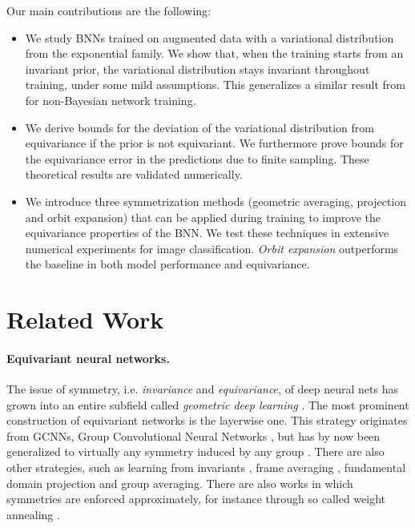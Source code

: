 \documentclass{article}
\begin{document}
Our main contributions are the following:
\begin{itemize}
    \item We study BNNs trained on augmented data with a variational distribution from the exponential family. We show that, when the training starts from an invariant prior, the variational distribution stays invariant throughout training, under some mild assumptions. This generalizes a similar result from \citet{nordenfors2025optimization} for non-Bayesian network training.
    \item We derive bounds for the deviation of the variational distribution from equivariance if the prior is not equivariant. We furthermore prove bounds for the equivariance error in the predictions due to finite sampling. These theoretical results are validated numerically.
    \item We introduce three symmetrization methods (geometric averaging, projection and orbit expansion) that can be applied during training to improve the equivariance properties of the BNN. We test these techniques in extensive numerical experiments for image classification. \emph{Orbit expansion} outperforms the baseline in both model performance and equivariance.
    
\end{itemize}





\section{Related Work}

\paragraph{Equivariant neural networks.}
The issue of symmetry,
i.e. \emph{invariance} and \emph{equivariance}, of deep neural nets has grown into an entire  subfield called \emph{geometric deep learning} \citep{bronstein2017geometric}. The most prominent construction of
equivariant networks is the layerwise one. This strategy originates from GCNNs, Group Convolutional Neural Networks \citep{cohenGroupEquivariantConvolutional2016}, but has by now been generalized to virtually any symmetry induced by any group \citep{kondor2018generalization,keriven2019universal,gerken2023}. There are also other strategies, such as learning from invariants \citep{villar2021scalars}, frame averaging \citep{puny2022frame}, fundamental domain projection \citep{aslan2023group} and group averaging. There are also works in which symmetries are enforced approximately, for instance through so called weight annealing \citep{wang2022approximately}.
\end{document}
